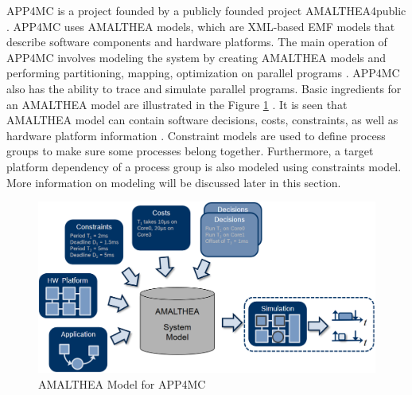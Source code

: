 APP4MC is a project founded by a publicly founded project AMALTHEA4public \cite{amalthea4publicweb}. APP4MC uses AMALTHEA models, which are XML-based EMF models that describe software components and hardware platforms. The main operation of APP4MC involves modeling the system by creating AMALTHEA models and performing partitioning, mapping, optimization on parallel programs \cite{ICPDSSE}. APP4MC also has the ability to trace and simulate parallel programs. Basic ingredients for an AMALTHEA model are illustrated in the Figure \ref{fig:app4mcmodel} \cite{app4mcweb}. It is seen that AMALTHEA model can contain software decisions, costs, constraints, as well as hardware platform information \cite{app4mcweb}. Constraint models are used to define process groups to make sure some processes belong together. Furthermore, a target platform dependency of a process group is also modeled using constraints model. More information on modeling will be discussed later in this section.

\begin{figure}[!ht]
	\centering
	\captionsetup{justification=centering}
	\includegraphics[width=\textwidth]{content/images/app4mcmodel.png}
	\caption{AMALTHEA Model for APP4MC \cite{app4mcweb}}
	\label{fig:app4mcmodel}
\end{figure}

